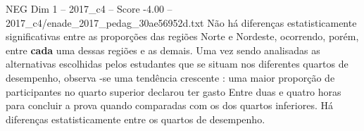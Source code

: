 \begin{textsample}{NEG Dim 1 – 2017\_c4 – Score -4.00 – 2017\_c4/enade\_2017\_pedag\_30ae56952d.txt}
Não há diferenças estatisticamente significativas entre as proporções das regiões Norte e Nordeste, ocorrendo, porém, entre \textbf{cada} uma dessas regiões e as demais.
Uma vez sendo analisadas as alternativas escolhidas pelos estudantes que se situam nos diferentes quartos de desempenho, observa -se uma tendência crescente : uma maior proporção de participantes no quarto superior declarou ter gasto Entre duas e quatro horas para concluir a prova quando comparadas com os dos quartos inferiores.
Há diferenças estatisticamente entre os quartos de desempenho.

\end{textsample}
